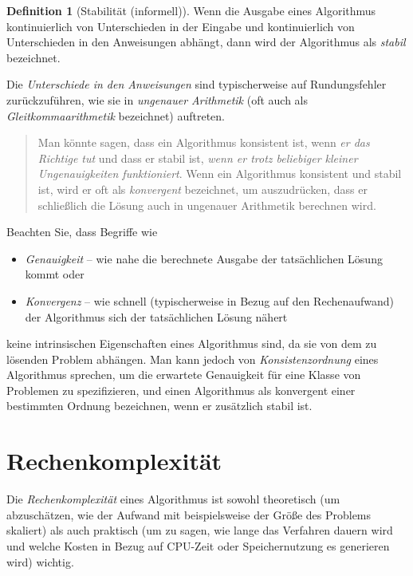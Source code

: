 \documentclass[
]{book}
\providecommand{\tightlist}{%
  \setlength{\itemsep}{0pt}\setlength{\parskip}{0pt}}
\newenvironment {JHSAYS} [0] {\begin{quote}\color{jhsc}} {\end{quote}}
\theoremstyle{definition}
\newtheorem{definition}{Definition}[chapter]
\theoremstyle{definition}
\theoremstyle{definition}
\theoremstyle{definition}
\theoremstyle{remark}
\begin{document}
\begin{definition}[Stabilität (informell)]
\protect\hypertarget{def:stability}{}\label{def:stability}Wenn die Ausgabe eines Algorithmus kontinuierlich von Unterschieden in der Eingabe und kontinuierlich von Unterschieden in den Anweisungen abhängt, dann wird der Algorithmus als \emph{stabil} bezeichnet.
\end{definition}

Die \emph{Unterschiede in den Anweisungen} sind typischerweise auf Rundungsfehler zurückzuführen, wie sie in \emph{ungenauer Arithmetik} (oft auch als \emph{Gleitkommaarithmetik} bezeichnet) auftreten.

\leavevmode\hypertarget{rem-coors}{}%
\begin{JHSAYS}
Man könnte sagen, dass ein Algorithmus konsistent ist, wenn \emph{er das Richtige tut} und dass er stabil ist, \emph{wenn er trotz beliebiger kleiner Ungenauigkeiten funktioniert}. Wenn ein Algorithmus konsistent und stabil ist, wird er oft als \emph{konvergent} bezeichnet, um auszudrücken, dass er schließlich die Lösung auch in ungenauer Arithmetik berechnen wird.

\end{JHSAYS}

Beachten Sie, dass Begriffe wie

\begin{itemize}
\tightlist
\item
  \emph{Genauigkeit} -- wie nahe die berechnete Ausgabe der tatsächlichen Lösung kommt oder
\item
  \emph{Konvergenz} -- wie schnell (typischerweise in Bezug auf den Rechenaufwand) der Algorithmus sich der tatsächlichen Lösung nähert
\end{itemize}

keine intrinsischen Eigenschaften eines Algorithmus sind, da sie von dem zu lösenden Problem abhängen.
Man kann jedoch von \emph{Konsistenzordnung} eines Algorithmus sprechen, um die erwartete Genauigkeit für eine Klasse von Problemen zu spezifizieren, und einen Algorithmus als konvergent einer bestimmten Ordnung bezeichnen, wenn er zusätzlich stabil ist.

\hypertarget{rechenkomplexituxe4t}{%
\section{Rechenkomplexität}\label{rechenkomplexituxe4t}}

Die \emph{Rechenkomplexität} eines Algorithmus ist sowohl theoretisch (um abzuschätzen, wie der Aufwand mit beispielsweise der Größe des Problems skaliert) als auch praktisch (um zu sagen, wie lange das Verfahren dauern wird und welche Kosten in Bezug auf CPU-Zeit oder Speichernutzung es generieren wird) wichtig.
\end{document}
